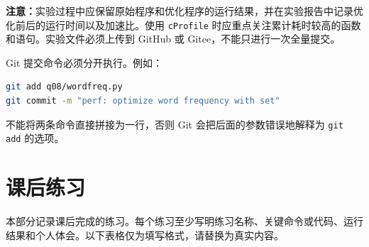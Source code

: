 \documentclass[UTF8,12pt,a4paper]{ctexart}
\begin{document}
\textbf{注意：}实验过程中应保留原始程序和优化程序的运行结果，并在实验报告中记录优化前后的运行时间以及加速比。使用 \texttt{cProfile} 时应重点关注累计耗时较高的函数和语句。实验文件必须上传到 GitHub 或 Gitee，不能只进行一次全量提交。

Git 提交命令必须分开执行。例如：

\begin{lstlisting}[language=bash]
git add q08/wordfreq.py
git commit -m "perf: optimize word frequency with set"
\end{lstlisting}

不能将两条命令直接拼接为一行，否则 Git 会把后面的参数错误地解释为 \texttt{git add} 的选项。




\section{课后练习}

本部分记录课后完成的练习。每个练习至少写明练习名称、关键命令或代码、运行结果和个人体会。以下表格仅为填写格式，请替换为真实内容。
\end{document}
